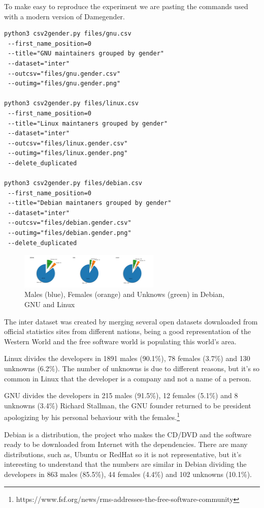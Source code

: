 \documentclass[a4paper]{article}
\begin{document}
To make easy to reproduce the experiment we are pasting the commands
used with a modern version of Damegender.

\begin{verbatim}
python3 csv2gender.py files/gnu.csv
 --first_name_position=0
 --title="GNU maintainers grouped by gender"
 --dataset="inter"
 --outcsv="files/gnu.gender.csv"
 --outimg="files/gnu.gender.png"

python3 csv2gender.py files/linux.csv
 --first_name_position=0
 --title="Linux maintaners grouped by gender"
 --dataset="inter"
 --outcsv="files/linux.gender.csv"
 --outimg="files/linux.gender.png"
 --delete_duplicated

python3 csv2gender.py files/debian.csv
 --first_name_position=0
 --title="Debian maintaners grouped by gender"
 --dataset="inter"
 --outcsv="files/debian.gender.csv"
 --outimg="files/debian.gender.png"
 --delete_duplicated
\end{verbatim}

\begin{figure}
  \centering
  \includegraphics[width=0.6\textwidth]{images/debian_gnu_linux.pdf}
  \caption[Caption for LOF]{Males (blue), Females (orange) and Unknows (green) in Debian, GNU and Linux}
\end{figure}

The inter dataset was created by merging several open datasets
downloaded from official statistics sites from different nations,
being a good representation of the Western World and the free
software world is populating this world's area\cite{gonzalez2008geographic}.

Linux divides the developers in 1891 males (90.1\%), 78 females
(3.7\%) and 130 unknowns (6.2\%). The number of unknowns is due to
different reasons, but it's so common in Linux that the developer is a
company and not a name of a person.

GNU divides the developers in 215 males (91.5\%), 12 females (5.1\%)
and 8 unknowns (3.4\%) Richard Stallman, the GNU founder returned to
be president apologizing by his personal behaviour with the
females.\footnote{https://www.fsf.org/news/rms-addresses-the-free-software-community}

Debian is a distribution, the project who makes the CD/DVD and the
software ready to be downloaded from Internet with the
dependencies. There are many distributions, such as, Ubuntu or RedHat
so it is not representative, but it's interesting to understand that
the numbers are similar in Debian dividing the developers in 863 males
(85.5\%), 44 females (4.4\%) and 102 unknowns (10.1\%).
\end{document}
